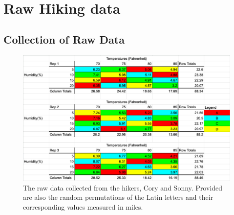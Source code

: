 

%
\chapter*{\thechapter \quad Raw Hiking data}
\label{appendixB}

\section{Collection of Raw Data}
\begin{figure}[htp]
    \centering
    \includegraphics[width=150mm, origin=c]{530_proj_RawData.png}
    \caption{The raw data collected from the hikers, Cory and Sonny. Provided are also the random permutations of the Latin letters and their corresponding values measured in miles.}
    \label{fig:Raw Data}
\end{figure}
